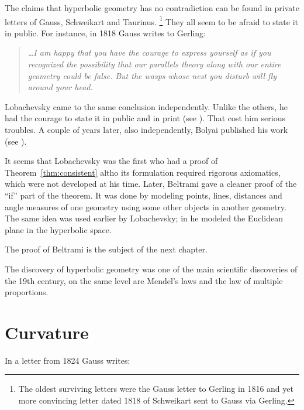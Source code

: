 The claims
that hyperbolic geometry has no contradiction can be found in private letters of
Gauss, 
Schweikart 
and Taurinus.%
\footnote{The oldest surviving letters were the Gauss letter to Gerling in 1816 
and yet more convincing letter dated 1818 
of Schweikart sent to Gauss via Gerling.}
They all seem to be afraid to state it in public.
For instance, in 1818 Gauss writes to Gerling:

\smallskip

\begin{quotation}{\it
\dots I am happy that you have the courage to express yourself as if you recognized the possibility
that our parallels theory along with our entire geometry could be false. But the wasps whose
nest you disturb will fly around your head.}
\end{quotation}

\smallskip

Lobachevsky came to the same conclusion independently.
Unlike the others, he had the courage to state it in public and in print (see \cite{lobachevsky}).
That cost him serious troubles.
A couple of years later, also independently, Bolyai published his work (see \cite{bolyai}).

It seems that Lobachevsky was the first who had a proof of Theorem~\ref{thm:consistent} altho its formulation required rigorous axiomatics, which were not developed at his time.
Later, Beltrami gave a cleaner proof of the ``if'' part of the theorem.
It was done by modeling points, lines, distances and angle measures of one geometry using some other objects in another geometry.
The same idea was used earlier by Lobachevsky; 
in \cite[34]{lobachevsky-1840} he modeled the Euclidean plane in the hyperbolic space.

The proof of Beltrami is the subject of the next chapter. 

\medskip

The discovery of hyperbolic geometry was one of the main scientific discoveries of the 19th century, on the same level are Mendel's laws and the law of multiple proportions.

\section*{Curvature}
In a letter from 1824 Gauss writes: 

